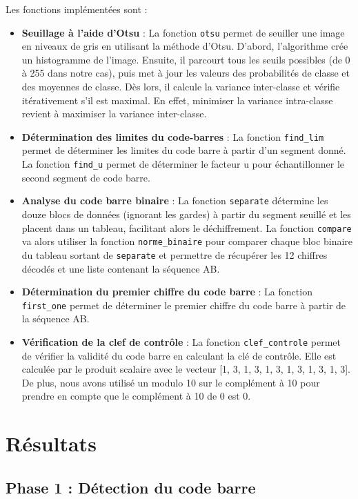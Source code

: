 \documentclass{rapport}
\begin{document}
Les fonctions implémentées sont :
\begin{itemize}
	\item \textbf{Seuillage à l'aide d'Otsu} : La fonction \texttt{otsu} permet de seuiller une image en niveaux de gris en utilisant la méthode d'Otsu.
	D'abord, l'algorithme crée un histogramme de l'image. Ensuite, il parcourt tous les seuils possibles (de 0 à 255 dans notre cas), puis met à jour les valeurs des probabilités de classe et des moyennes de classe. 
	Dès lors, il calcule la variance inter-classe et vérifie itérativement s'il est maximal. En effet, minimiser la variance intra-classe revient à maximiser la variance inter-classe.
	\item \textbf{Détermination des limites du code-barres} : La fonction \texttt{find\_lim} permet de déterminer les limites du code barre à partir d'un segment donné. 
	La fonction \texttt{find\_u} permet de déterminer le facteur u pour échantillonner le second segment de code barre.
	\item \textbf{Analyse du code barre binaire} : La fonction \texttt{separate} détermine les douze blocs de données (ignorant les gardes) à partir du segment seuillé et les placent dans un tableau, facilitant alors le déchiffrement. 
	La fonction \texttt{compare} va alors utiliser la fonction \texttt{norme\_binaire} pour comparer chaque bloc binaire du tableau sortant de \texttt{separate} et permettre de récupérer les 12 chiffres décodés et une liste contenant la séquence AB.
	\item \textbf{Détermination du premier chiffre du code barre} : La fonction \texttt{first\_one} permet de déterminer le premier chiffre du code barre à partir de la séquence AB.
	\item \textbf{Vérification de la clef de contrôle} : La fonction \texttt{clef\_controle} permet de vérifier la validité du code barre en calculant la clé de contrôle.
	Elle est calculée par le produit scalaire avec le vecteur [1, 3, 1, 3, 1, 3, 1, 3, 1, 3, 1, 3]. De plus, nous avons utilisé un modulo 10 sur le complément à 10 pour prendre en compte que le complément à 10 de 0 est 0.
\end{itemize}

\section{Résultats}

\subsection{Phase 1 : Détection du code barre}
\end{document}
